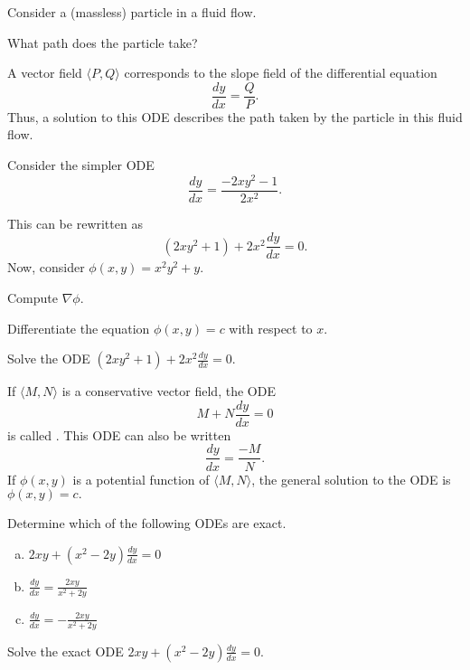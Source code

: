\begin{applicationActivities}

\begin{observation}
Consider a (massless) particle in a fluid flow.


What path does the particle take?
\end{observation}

\begin{observation}
A vector field \(\langle P,Q\rangle\) corresponds to the slope field of the differential equation \[\frac{dy}{dx}=\frac{Q}{P}.\]
\vfill
Thus, a solution to this ODE describes the path taken by the particle in this fluid flow.
\end{observation}

\begin{activity}{10}
Consider the simpler ODE \[\frac{dy}{dx} = \frac{-2xy^2-1}{2x^2}.\]

This can be rewritten as \[ (2xy^2+1) + 2x^2 \frac{dy}{dx} = 0 .\]
\vfill
Now, consider \(\phi(x,y)=x^2y^2+y \).  
\begin{subactivity}
Compute \(\nabla \phi \).
\end{subactivity}
\begin{subactivity}
Differentiate the equation \(\phi(x,y)=c\) with respect to \(x\).
\end{subactivity}
\begin{subactivity}
Solve the ODE \( (2xy^2+1) + 2x^2 \frac{dy}{dx} = 0 \).
\end{subactivity}
\end{activity}

\begin{definition}
If \(\langle M,N\rangle\) is a conservative vector field, the ODE
\[M + N \frac{dy}{dx} = 0 \]
is called .  This ODE can also be written
\[\frac{dy}{dx} = \frac{ -M}{N} .\]
If \(\phi(x,y)\) is a potential function of \(\langle M,N\rangle\), the general solution to the
ODE is \(\phi(x,y)=c.\)
\end{definition}

\begin{activity}{10}
Determine which of the following ODEs are exact.
\begin{enumerate}[(a)]
\item \(2xy+(x^2-2y)\frac{dy}{dx}=0\) 
\item \(\frac{dy}{dx} = \frac{2xy}{x^2+2y} \)
\item \(\frac{dy}{dx} = -\frac{2xy}{x^2+2y} \)
\end{enumerate}
\end{activity}

\begin{activity}{10}
Solve the exact ODE \(2xy+(x^2-2y) \frac{dy}{dx}=0\).
\end{activity}


\end{applicationActivities}
